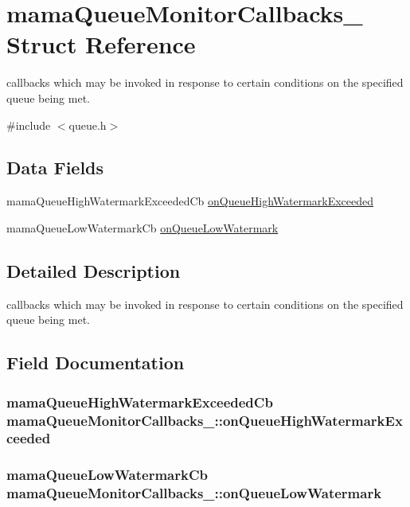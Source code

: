 \hypertarget{structmamaQueueMonitorCallbacks__}{
\section{mamaQueueMonitorCallbacks\_\- Struct Reference}
\label{structmamaQueueMonitorCallbacks__}
}


callbacks which may be invoked in response to certain conditions on the specified queue being met.  


{\ttfamily \#include $<$queue.h$>$}\subsection*{Data Fields}
\begin{DoxyCompactItemize}
\item 
mamaQueueHighWatermarkExceededCb \hyperlink{structmamaQueueMonitorCallbacks___a12c3e5bf80f2af27c45b53e45f0a2627}{onQueueHighWatermarkExceeded}
\item 
mamaQueueLowWatermarkCb \hyperlink{structmamaQueueMonitorCallbacks___a804c81164c9d8bd7ee4cbb0941410614}{onQueueLowWatermark}
\end{DoxyCompactItemize}


\subsection{Detailed Description}
callbacks which may be invoked in response to certain conditions on the specified queue being met. 

\subsection{Field Documentation}
\hypertarget{structmamaQueueMonitorCallbacks___a12c3e5bf80f2af27c45b53e45f0a2627}{
\subsubsection[{onQueueHighWatermarkExceeded}]{\setlength{\rightskip}{0pt plus 5cm}mamaQueueHighWatermarkExceededCb {\bf mamaQueueMonitorCallbacks\_\-::onQueueHighWatermarkExceeded}}}
\label{structmamaQueueMonitorCallbacks___a12c3e5bf80f2af27c45b53e45f0a2627}
\hypertarget{structmamaQueueMonitorCallbacks___a804c81164c9d8bd7ee4cbb0941410614}{
\subsubsection[{onQueueLowWatermark}]{\setlength{\rightskip}{0pt plus 5cm}mamaQueueLowWatermarkCb {\bf mamaQueueMonitorCallbacks\_\-::onQueueLowWatermark}}}
\label{structmamaQueueMonitorCallbacks___a804c81164c9d8bd7ee4cbb0941410614}
